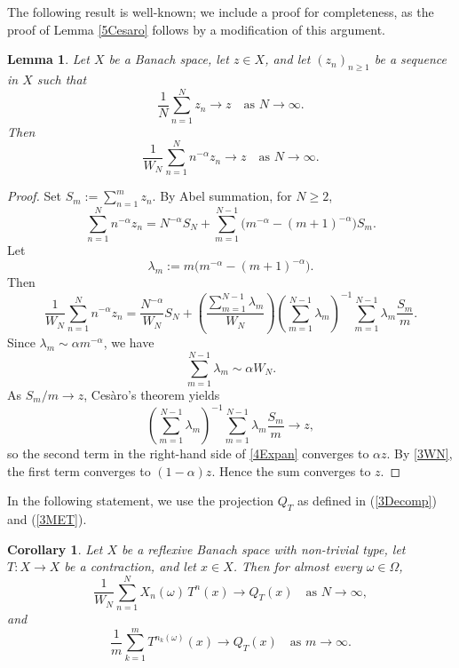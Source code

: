 \documentclass[12pt]{amsart}
\newtheorem{lemma}[theorem]{Lemma}
\newtheorem{corollary}[theorem]{Corollary}
\theoremstyle{remark}
\theoremstyle{definition}
\numberwithin{equation}{section}
\begin{document}
The following result is well-known; we include a proof for completeness, as the proof of Lemma \ref{5Cesaro} follows by a modification of this argument.

\begin{lemma}\label{4Cesaro}
Let $X$ be a Banach space, let $z\in X$, and let $(z_n)_{n\geq 1}$ be a sequence in $X$ such that
\[
\frac{1}{N}\sum_{n=1}^N z_n \longrightarrow z \quad \text{as } N\to\infty.
\]
Then
\[
\frac{1}{W_N}\sum_{n=1}^N n^{-\alpha} z_n \longrightarrow z \quad \text{as } N\to\infty.
\]
\end{lemma}

\begin{proof}
Set $S_m := \sum_{n=1}^m z_n$. By Abel summation, for $N \ge 2$,
\[
\sum_{n=1}^N n^{-\alpha} z_n
= N^{-\alpha} S_N + \sum_{m=1}^{N-1} \bigl(m^{-\alpha} - (m+1)^{-\alpha}\bigr) S_m.
\]
Let
\[
\lambda_m := m \bigl(m^{-\alpha} - (m+1)^{-\alpha}\bigr).
\]
Then
\begin{equation}\label{4Expan}
\frac{1}{W_N} \sum_{n=1}^N n^{-\alpha} z_n
=
\frac{N^{-\alpha}}{W_N} S_N
+
\left(\frac{\sum_{m=1}^{N-1} \lambda_m}{W_N}\right)
\left(\sum_{m=1}^{N-1} \lambda_m\right)^{-1}
\sum_{m=1}^{N-1} \lambda_m \frac{S_m}{m}.
\end{equation}
Since $\lambda_m \sim \alpha m^{-\alpha}$, we have
\begin{equation}\label{4Alpha}
\sum_{m=1}^{N-1} \lambda_m \sim \alpha W_N.
\end{equation}
As $S_m/m \to z$, Cesàro's theorem yields
\[
\left(\sum_{m=1}^{N-1} \lambda_m\right)^{-1}
\sum_{m=1}^{N-1} \lambda_m \frac{S_m}{m} \longrightarrow z,
\]
so the second term in the right-hand side 
of \eqref{4Expan} converges to $\alpha z$. 
By \eqref{3WN}, the first term converges to $(1-\alpha)z$. 
Hence the sum converges to $z$.
\end{proof}


In the following statement, we use the projection $Q_T$ as defined in (\ref{3Decomp}) and (\ref{3MET}).

\begin{corollary}\label{4NormCV}
Let $X$ be a reflexive Banach space with non-trivial type, let
$T\colon X \to X$ be a contraction, and let $x \in X$. Then for almost every $\omega \in \Omega$,
\[
\frac{1}{W_N}\sum_{n=1}^N X_n(\omega)\, T^n(x) \longrightarrow Q_T(x)
\quad \text{as } N\to\infty,
\]
and
\[
\frac{1}{m}\sum_{k=1}^m T^{n_k(\omega)}(x) \longrightarrow Q_T(x)
\quad \text{as } m\to\infty.
\]
\end{corollary}
\end{document}
